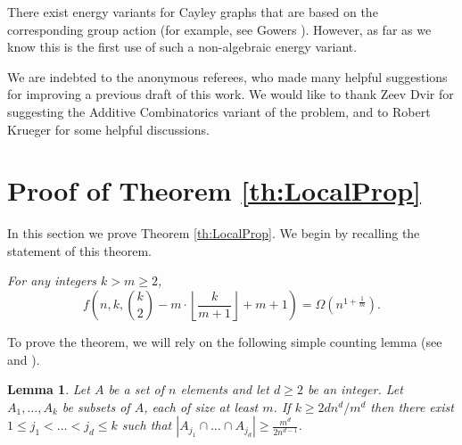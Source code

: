 \documentclass[11pt]{article}
\newtheorem{lemma}[theorem]{Lemma}
\newcommand{\parag}[1]{\vspace{2mm}

\noindent{\bf #1} }
\begin{document}
There exist energy variants for Cayley graphs that are based on the corresponding group action (for example, see Gowers \cite{Gowers08}).
However, as far as we know this is the first use of such a non-algebraic energy variant.

\parag{Acknowledgements.}
We are indebted to the anonymous referees, who made many helpful suggestions for improving a previous draft of this work.
We would like to thank Zeev Dvir for suggesting the Additive Combinatorics variant of the problem, and to Robert Krueger for some helpful discussions.

\section{Proof of Theorem \ref{th:LocalProp}}\label{sec:DDlocal}

In this section we prove Theorem \ref{th:LocalProp}.
We begin by recalling the statement of this theorem.
\vspace{1mm}

\emph{For any integers $k > m \ge 2$,}
%
\[ f\left(n,k,\binom{k}{2} -  m\cdot \left\lfloor\frac{k}{m+1}\right\rfloor  + m+1 \right) = \Omega\left(n^{1+\frac{1}{m}}\right). \]

To prove the theorem, we will rely on the following simple counting lemma (see \cite{Erdos64} and \cite[Lemma 2.3]{Jukna11}).

\begin{lemma} \label{le:GeneralSetIntersection}
Let $A$ be a set of $n$ elements and let $d\ge 2$ be an integer.
Let $A_1,\ldots,A_k$ be subsets of $A$, each of size at least $m$.
If $k \ge 2d n^d/m^d$ then there exist $1\le j_1 < \ldots < j_d \le k$ such that $|A_{j_1}\cap \ldots \cap A_{j_d}| \ge \frac{m^d}{2n^{d-1}}$.
\end{lemma}
\end{document}
